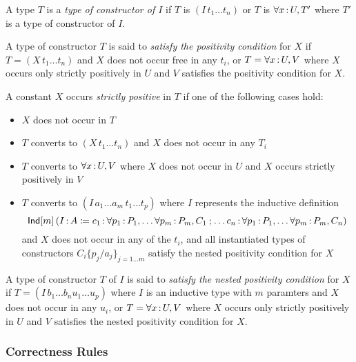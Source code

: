 \documentclass{article}
\begin{document}
\begin{definition}
A type $T$ is a \emph{type of constructor of $I$} if $T$ is $(I\, t_1 \ldots t_n)$ or
$T$ is $\forall x {\,:\,} U , T'$ where $T'$ is a type of constructor of $I$.
\end{definition}

\begin{definition}
A type of constructor $T$ is said to \emph{satisfy the positivity condition} for
$X$ if $T = (X\, t_1 \ldots t_n)$ and $X$ does not occur free in any $t_i$, or
$T = \forall x {\,:\,} U , V$ where $X$ occurs only strictly positively in $U$ and
$V$ satisfies the positivity condition for $X$.
\end{definition}
\begin{definition}
A constant $X$ occurs \emph{strictly positive} in $T$ if one of the following
cases hold:
\begin{itemize}
\item $X$ does not occur in $T$
\item $T$ converts to $(X\, t_1 \ldots t_n)$ and $X$ does not occur in any $T_i$
\item $T$ converts to $\forall x {\,:\,} U , V$ where $X$ does not occur in $U$ and
  $X$ occurs strictly positively in $V$
\item $T$ converts to $(I\, a_1\ldots a_m\, t_1\ldots t_p)$ where $I$ represents
  the inductive definition
  \[\mathsf{Ind}[m]\left(I {\,:\,} A \coloneqq c_1 {\,:\,} \forall p_1 {\,:\,} P_1, \ldots \forall p_m {\,:\,} P_m, C_1
    \mathbin{;} \ldots c_n {\,:\,} \forall p_1 {\,:\,} P_1, \ldots \forall p_m {\,:\,} P_m, C_n\right)
  \]
  and $X$ does not occur in any of the $t_i$, and all instantiated types of
  constructors $C_i\{p_j/a_j\}_{j=1\ldots m}$ satisfy the nested positivity
  condition for $X$
\end{itemize}
\end{definition}
\begin{definition}
A type of constructor $T$ of $I$ is said to \emph{satisfy the nested positivity
  condition} for $X$ if $T = (I\, b_1 \ldots b_n u_1 \ldots u_p)$ where $I$ is
an inductive type with $m$ paramters and $X$ does not occur in any $u_i$, or
$T = \forall x {\,:\,} U , V$ where $X$ occurs only strictly positively in $U$ and $V$
satisfies the nested positivity condition for $X$.
\end{definition}

\subsubsection{Correctness Rules}
\end{document}
